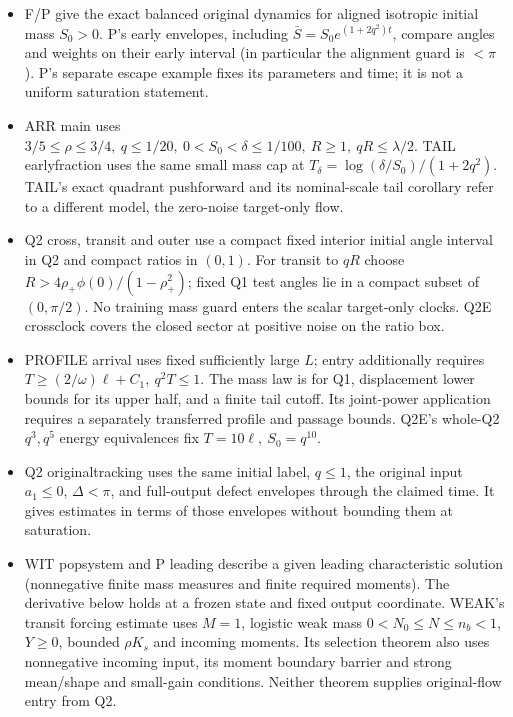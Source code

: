 \documentclass[11pt]{article}
\begin{document}
\begin{itemize}
\item F/P give the exact balanced original dynamics for aligned isotropic
initial mass \(S_0>0\). P's early envelopes, including
\(\bar S=S_0e^{(1+2q^2)t}\), compare angles and weights on their
early interval (in particular the alignment guard is \(<\pi\)).
P's separate escape example fixes its parameters and time; it is
not a uniform saturation statement.
\item ARR main uses \(3/5\le\rho\le3/4,\ q\le1/20,\
0<S_0<\delta\le1/100,\ R\ge1,\ qR\le\lambda/2\).
TAIL earlyfraction uses the same small mass cap at
\(T_\delta=\log(\delta/S_0)/(1+2q^2)\). TAIL's exact quadrant
pushforward and its nominal-scale tail corollary refer to a different
model, the zero-noise target-only flow.
\item Q2 cross, transit and outer use a compact fixed interior initial
angle interval in Q2 and compact ratios in \((0,1)\). For transit to
\(qR\) choose \(R>4\rho_+\phi(0)/(1-\rho_+^2)\); fixed Q1 test angles
lie in a compact subset of \((0,\pi/2)\). No training mass guard enters
the scalar target-only clocks. Q2E crossclock covers the closed sector
at positive noise on the ratio box.
\item PROFILE arrival uses fixed sufficiently large \(L\); entry additionally
requires \(T\ge(2/\omega)\ell+C_1,\ q^2T\le1\). The mass law is for
Q1, displacement lower bounds for its upper half, and a finite tail cutoff.
Its joint-power application requires a separately transferred profile and
passage bounds. Q2E's whole-Q2 \(q^3,q^5\) energy equivalences fix
\(T=10\ell,\ S_0=q^{10}\).
\item Q2 originaltracking uses the same initial label, \(q\le1\),
the original input \(a_1\le0\), \(\Delta<\pi\), and full-output defect
envelopes through the claimed time. It gives estimates in terms of those
envelopes without bounding them at saturation.
\item WIT popsystem and P leading describe a given leading characteristic
solution (nonnegative finite mass measures and finite required moments).
The derivative below holds at a frozen state and fixed output coordinate.
WEAK's transit forcing estimate uses \(M=1\), logistic weak mass
\(0<N_0\le N\le n_b<1\), \(Y\ge0\), bounded \(\rho K_s\) and
incoming moments. Its selection theorem also uses nonnegative incoming
input, its moment boundary barrier and strong mean/shape and small-gain
conditions. Neither theorem supplies original-flow entry from Q2.
\end{itemize}
\end{document}
